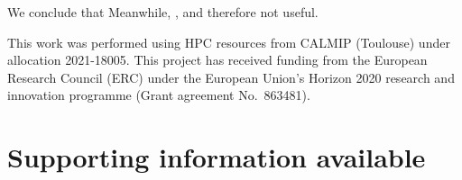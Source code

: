 \documentclass[aip,jcp,reprint,noshowkeys,superscriptaddress]{revtex4-1}
\begin{document}
We conclude that 
Meanwhile, 
, and therefore not useful.


\begin{acknowledgements}
This work was performed using HPC resources from CALMIP (Toulouse) under allocation 2021-18005.
This project has received funding from the European Research Council (ERC) under the European Union's Horizon 2020 research and innovation programme (Grant agreement No.~863481).
\end{acknowledgements}

\section*{Supporting information available}
\label{sec:SI}



\end{document}
